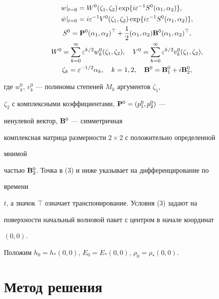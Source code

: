 \begin{gather} 


\begin{split} 


w|_{t=0}&=W^0(\zeta_1,\zeta_2)\exp\{i\varepsilon^{-1} 


S^0(\alpha_1,\alpha_2)\},\\ 


\Dot w|_{t=0}&=i\varepsilon^{-1}V^0(\zeta_1,\zeta_2) 


\exp\{i\varepsilon^{-1}S^0(\alpha_1,\alpha_2)\}, 


\end{split} \\


S^0=\BP^0(\alpha_1,\alpha_2)^\top+\frac{1}{2}(\alpha_1,\alpha_2) 


\BB^0(\alpha_1,\alpha_2)^\top, \notag \\ 


W^0=\sum^\infty_{k=0}\varepsilon^{k/2}w^0_k(\zeta_1,\zeta_2),\quad 


V^0=\sum^\infty_{k=0}\varepsilon^{k/2}v^0_k(\zeta_1,\zeta_2), \notag \\ 


\zeta_k=\varepsilon^{-1/2}\alpha_k,\quad k=1,2,\quad 


\BB^0=\BB^0_1+i\BB^0_2, \notag 


\end{gather} 


где $w^0_k$, $v^0_k$ --- полиномы степеней $M_k$ аргументов $\zeta_1$, 


$\zeta_2$ с комплексными коэффициентами, $\bold P^0=(p^0_1,p^0_2)$ --- 


ненулевой вектор, $\bold B^0$ --- симметричная 


комплексная матрица размерности $2\times 2$ с положительно определенной 


мнимой 


частью $\bold B^0_2$. Точка в (3) и ниже указывает на дифференцирование по 


времени 


$t$, а значок $\top$ означает транспонирование. Условия (3) задают на 


поверхности начальный волновой пакет с центром в начале координат


$(0,0)$. 


Положим $h_0=h_*(0,0)$, $E_0=E_*(0,0)$, $\rho_0=\rho_*(0,0)$. 


 


\section{Метод решения} 


